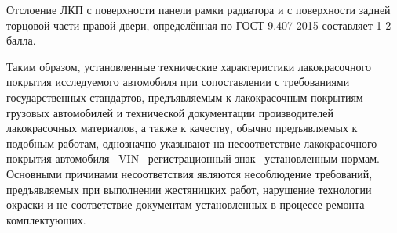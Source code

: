 {Отслоение ЛКП с поверхности панели рамки радиатора и  с поверхности  задней  торцовой части правой двери, определённая  по ГОСТ 9.407-2015  составляет 1-2 балла.
  	

  
  Таким образом, установленные технические характеристики лакокрасочного
  покрытия исследуемого автомобиля при сопоставлении с требованиями государственных
  стандартов, предъявляемым к лакокрасочным покрытиям грузовых автомобилей и
  технической документации производителей лакокрасочных материалов, а также к качеству, обычно предъявляемых к подобным работам,  однозначно
  указывают на несоответствие лакокрасочного покрытия автомобиля \tc\, VIN
  \, регистрационный знак \, установленным нормам. Основными
  причинами несоответствия  являются несоблюдение требований, предъявляемых при выполнении жестяницких работ,    нарушение технологии   окраски и не соответствие документам  установленных в процессе ремонта комплектующих. 
  
   
 
	

}
